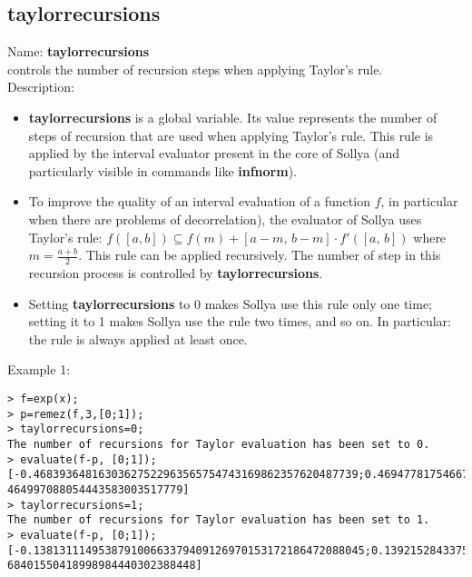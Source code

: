 \subsection{taylorrecursions}
\label{labtaylorrecursions}
\noindent Name: \textbf{taylorrecursions}\\
controls the number of recursion steps when applying Taylor's rule.\\

\noindent Description: \begin{itemize}

\item \textbf{taylorrecursions} is a global variable. Its value represents the number of steps
   of recursion that are used when applying Taylor's rule. This rule is applied
   by the interval evaluator present in the core of Sollya (and particularly
   visible in commands like \textbf{infnorm}).

\item To improve the quality of an interval evaluation of a function $f$, in 
   particular when there are problems of decorrelation), the evaluator of Sollya
   uses Taylor's rule:  $f([a,b]) \subseteq f(m) + [a-m,\,b-m] \cdot f'([a,\,b])$ where $m=\frac{a+b}{2}$.
   This rule can be applied recursively.
   The number of step in this recursion process is controlled by \textbf{taylorrecursions}.

\item Setting \textbf{taylorrecursions} to 0 makes Sollya use this rule only one time;
   setting it to 1 makes Sollya use the rule two times, and so on.
   In particular: the rule is always applied at least once.
\end{itemize}
\noindent Example 1: 
\begin{center}\begin{minipage}{15cm}\begin{Verbatim}[frame=single]
> f=exp(x);
> p=remez(f,3,[0;1]);
> taylorrecursions=0;
The number of recursions for Taylor evaluation has been set to 0.
> evaluate(f-p, [0;1]);
[-0.46839364816303627522963565754743169862357620487739;0.46947781754667086491682
464997088054443583003517779]
> taylorrecursions=1;
The number of recursions for Taylor evaluation has been set to 1.
> evaluate(f-p, [0;1]);
[-0.138131114953879100663379409126970153172186472088045;0.1392152843375136903505
68401550418998984440302388448]
\end{Verbatim}
\end{minipage}\end{center}
